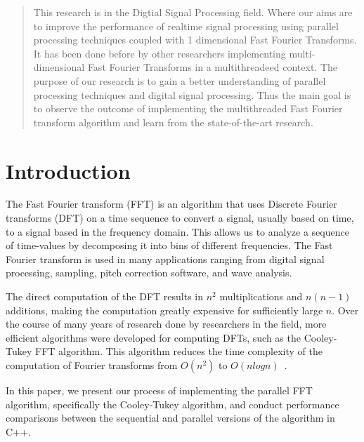 \documentclass[journal]{IEEEtran}
\begin{document}
\maketitle

\begin{abstract}
This research is in the Digtial Signal Processing field. Where our aims are to improve the performance of realtime signal processing using parallel processing techniques coupled with 1 dimensional Fast Fourier Transforms.  It has been done before by other researchers implementing multi-dimensional Fast Fourier Transforms in a multithreadeed context. The purpose of our research is to gain a better understanding of parallel processing techniques and digital signal processing. Thus the main goal is to observe the outcome of implementing the multithreaded Fast Fourier transform algorithm and learn from the state-of-the-art research.
\end{abstract}

\section{Introduction}
	\par {The Fast Fourier transform (FFT) is an algorithm that uses Discrete Fourier transforms
	 (DFT) on a time sequence to convert a signal, usually based on time, to a signal based in the
	 frequency domain. This allows us to analyze a sequence of time-values by decomposing it into 
	 bins of different frequencies. The Fast Fourier transform is used in many applications ranging 
	 from digital signal processing, sampling, pitch correction software, and wave analysis.}

	\par {The direct computation of the DFT results in $n^2$ multiplications and $n(n-1)$ additions, 
	making the computation greatly expensive for sufficiently large $n$.  Over the course of many years
	of research done by researchers in the field, more efficient algorithms were developed for computing DFTs,
	such as the Cooley-Tukey FFT algorithm. This algorithm reduces the time complexity of the computation of
	Fourier transforms from $O(n^2)$ to $O(nlogn)$~\cite{Xiang}}.

	\par {In this paper, we present our process of implementing the parallel FFT algorithm, specifically
	the Cooley-Tukey algorithm, and conduct performance comparisons between the sequential and 
	parallel versions of the algorithm in C++.}
\end{document}
